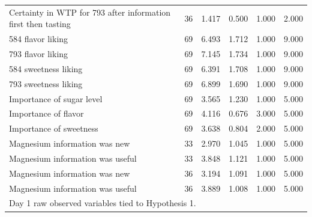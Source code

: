 \begin{table}[htbp]
\begin{tabular}{l*{1}{ccccc}}
Certainty in WTP for 793 after information first then tasting&          36&       1.417&       0.500&       1.000&       2.000\\
584 flavor liking   &          69&       6.493&       1.712&       1.000&       9.000\\
793 flavor liking   &          69&       7.145&       1.734&       1.000&       9.000\\
584 sweetness liking&          69&       6.391&       1.708&       1.000&       9.000\\
793 sweetness liking&          69&       6.899&       1.690&       1.000&       9.000\\
Importance of sugar level&          69&       3.565&       1.230&       1.000&       5.000\\
Importance of flavor&          69&       4.116&       0.676&       3.000&       5.000\\
Importance of sweetness&          69&       3.638&       0.804&       2.000&       5.000\\
Magnesium information was new&          33&       2.970&       1.045&       1.000&       5.000\\
Magnesium information was useful&          33&       3.848&       1.121&       1.000&       5.000\\
Magnesium information was new&          36&       3.194&       1.091&       1.000&       5.000\\
Magnesium information was useful&          36&       3.889&       1.008&       1.000&       5.000\\
\bottomrule
\multicolumn{6}{l}{\footnotesize Day 1 raw observed variables tied to Hypothesis 1.}\\
\end{tabular}
\end{table}
